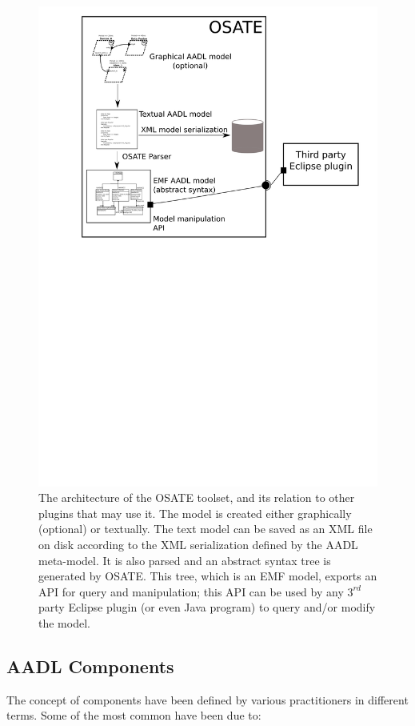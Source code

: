 \begin{figure}
\centering
\includegraphics[scale=0.9]{figs/osate_arch}
\caption{The architecture of the OSATE toolset, and its relation to
  other plugins that may use it. The model is created either
  graphically (optional) or textually. The text model can be saved as
  an XML file on disk according to the XML serialization defined by
  the AADL meta-model. It is also parsed and an abstract syntax tree
  is generated by OSATE. This tree, which is an EMF model, exports an
  API for query and manipulation; this API can be used by any $3^{rd}$
  party Eclipse plugin (or even Java program) to query and/or modify
  the model.}
\label{fig:osate_arch}
\end{figure}

\subsection{AADL Components}
The concept of components have been defined by various practitioners
in different terms. Some of the most common have been due to:


